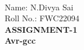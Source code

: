\documentclass[10pt]{report}
\begin{document}
 \vspace{3mm}\\ \raggedright Name: N.Divya Sai\hspace{12cm}\\
\raggedleft Roll No.: FWC22094
\\ \centering \Large \textbf{ASSIGNMENT-1}
\\ \centering \small \textbf{Avr-gcc}
\end{document}
